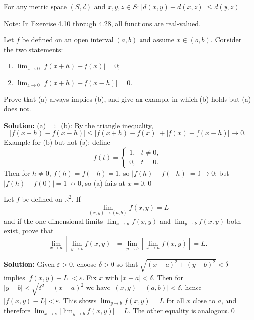 \begin{theorem}
For any metric space $(S,d)$ and $x,y,z \in S$: $|d(x,y) - d(x,z)| \leq d(y,z)$
\end{theorem}

Note: In Exercise 4.10 through 4.28, all functions are real-valued.



\begin{problembox}
Let $f$ be defined on an open interval $(a, b)$ and assume $x \in (a, b)$. Consider the two statements:
\begin{enumerate}[label=(\alph*)]
\item $\lim_{h \to 0} |f(x + h) - f(x)| = 0$;
\item $\lim_{h \to 0} |f(x + h) - f(x - h)| = 0$.
\end{enumerate}
Prove that (a) always implies (b), and give an example in which (b) holds but (a) does not.
\end{problembox}

\noindent\textbf{Solution:}
(a) $\Rightarrow$ (b): By the triangle inequality,
\[
|f(x+h)-f(x-h)|\le |f(x+h)-f(x)|+|f(x)-f(x-h)|\to 0.
\]
Example for (b) but not (a): define
\[
f(t)=\begin{cases}
1,& t\ne 0,\\
0,& t=0.
\end{cases}
\]
Then for $h\ne 0$, $f(h)=f(-h)=1$, so $|f(h)-f(-h)|=0\to 0$; but $|f(h)-f(0)|=1\not\to 0$, so (a) fails at $x=0$.\qed



\begin{problembox}
Let $f$ be defined on $\mathbb{R}^2$. If
\[\lim_{(x, y) \to (a, b)} f(x, y) = L\]
and if the one-dimensional limits $\lim_{x \to a} f(x, y)$ and $\lim_{y \to b} f(x, y)$ both exist, prove that
\[\lim_{x \to a} \left[ \lim_{y \to b} f(x, y) \right] = \lim_{y \to b} \left[ \lim_{x \to a} f(x, y) \right] = L.\]
\end{problembox}

\noindent\textbf{Solution:}
Given $\varepsilon>0$, choose $\delta>0$ so that $\sqrt{(x-a)^2+(y-b)^2}<\delta$ implies $|f(x,y)-L|<\varepsilon$. Fix $x$ with $|x-a|<\delta$. Then for $|y-b|<\sqrt{\delta^2-(x-a)^2}$ we have $|(x,y)-(a,b)|<\delta$, hence $|f(x,y)-L|<\varepsilon$. This shows $\lim_{y\to b}f(x,y)=L$ for all $x$ close to $a$, and therefore $\lim_{x\to a}\big[\lim_{y\to b}f(x,y)\big]=L$. The other equality is analogous.\qed




